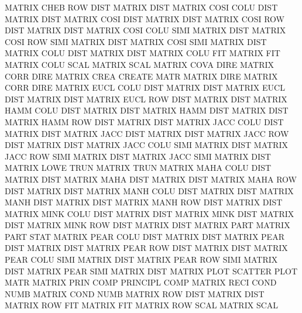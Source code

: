 MATRIX   CHEB ROW  DIST                 MATRIX   DIST
MATRIX   COSI COLU DIST                 MATRIX   DIST
MATRIX   COSI DIST                      MATRIX   DIST
MATRIX   COSI ROW  DIST                 MATRIX   DIST
MATRIX   COSI COLU SIMI                 MATRIX   DIST
MATRIX   COSI ROW  SIMI                 MATRIX   DIST
MATRIX   COSI SIMI                      MATRIX   DIST
MATRIX   COLU DIST                      MATRIX   DIST
MATRIX   COLU FIT                       MATRIX   FIT
MATRIX   COLU SCAL                      MATRIX   SCAL
MATRIX   COVA DIRE                      MATRIX   CORR DIRE
MATRIX   CREA                           CREATE   MATR
MATRIX   DIRE                           MATRIX   CORR DIRE
MATRIX   EUCL COLU DIST                 MATRIX   DIST
MATRIX   EUCL DIST                      MATRIX   DIST
MATRIX   EUCL ROW  DIST                 MATRIX   DIST
MATRIX   HAMM COLU DIST                 MATRIX   DIST
MATRIX   HAMM DIST                      MATRIX   DIST
MATRIX   HAMM ROW  DIST                 MATRIX   DIST
MATRIX   JACC COLU DIST                 MATRIX   DIST
MATRIX   JACC DIST                      MATRIX   DIST
MATRIX   JACC ROW  DIST                 MATRIX   DIST
MATRIX   JACC COLU SIMI                 MATRIX   DIST
MATRIX   JACC ROW  SIMI                 MATRIX   DIST
MATRIX   JACC SIMI                      MATRIX   DIST
MATRIX   LOWE TRUN                      MATRIX   TRUN
MATRIX   MAHA COLU DIST                 MATRIX   DIST
MATRIX   MAHA DIST                      MATRIX   DIST
MATRIX   MAHA ROW  DIST                 MATRIX   DIST
MATRIX   MANH COLU DIST                 MATRIX   DIST
MATRIX   MANH DIST                      MATRIX   DIST
MATRIX   MANH ROW  DIST                 MATRIX   DIST
MATRIX   MINK COLU DIST                 MATRIX   DIST
MATRIX   MINK DIST                      MATRIX   DIST
MATRIX   MINK ROW  DIST                 MATRIX   DIST
MATRIX   PART                           MATRIX   PART STAT
MATRIX   PEAR COLU DIST                 MATRIX   DIST
MATRIX   PEAR DIST                      MATRIX   DIST
MATRIX   PEAR ROW  DIST                 MATRIX   DIST
MATRIX   PEAR COLU SIMI                 MATRIX   DIST
MATRIX   PEAR ROW  SIMI                 MATRIX   DIST
MATRIX   PEAR SIMI                      MATRIX   DIST
MATRIX   PLOT                           SCATTER  PLOT MATR
MATRIX   PRIN COMP                      PRINCIPL COMP
MATRIX   RECI COND NUMB                 MATRIX   COND NUMB
MATRIX   ROW  DIST                      MATRIX   DIST
MATRIX   ROW  FIT                       MATRIX   FIT
MATRIX   ROW  SCAL                      MATRIX   SCAL
